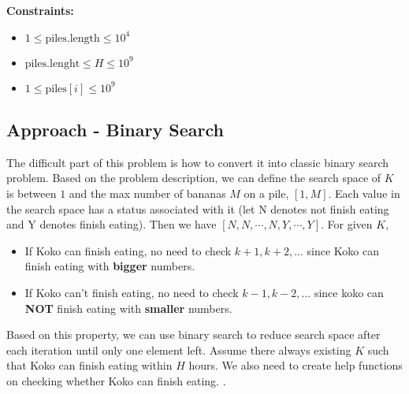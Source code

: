 \documentclass[justified]{tufte-book}
\begin{document}
\noindent \textbf{Constraints:}
\begin{itemize}
    \item $1 \leq \text{piles.length} \leq 10^4$
    \item $\text{piles.lenght} \leq H \leq 10^9$
    \item $1 \leq \text{piles}[i] \leq 10^9$
\end{itemize} 

\subsection{Approach - Binary Search}
The difficult part of this problem is how to convert it into classic binary search problem. Based on the problem description, we can define the search space of $K$ is between $1$ and the max number of bananas $M$ on a pile, $[1, M]$.  Each value in the search space has a status associated with it (let N denotes not finish eating and Y denotes finish eating). Then we have $[N, N, \cdots, N, Y, \cdots, Y]$. For given $K$, 
\begin{itemize}
    \item If Koko can finish eating, no need to check $k+1, k+2, ...$ since Koko can finish eating with \textbf{bigger} numbers.
    \item If Koko can't finish eating, no need to check $k-1, k-2, ...$ since koko can \textbf{NOT} finish eating with \textbf{smaller} numbers. 
\end{itemize}
Based on this property, we can use binary search to reduce search space after each iteration until only one element left. Assume there always existing $K$ such that Koko can finish eating within $H$ hours. We also need to create help functions on checking whether Koko can finish eating. .
\end{document}
